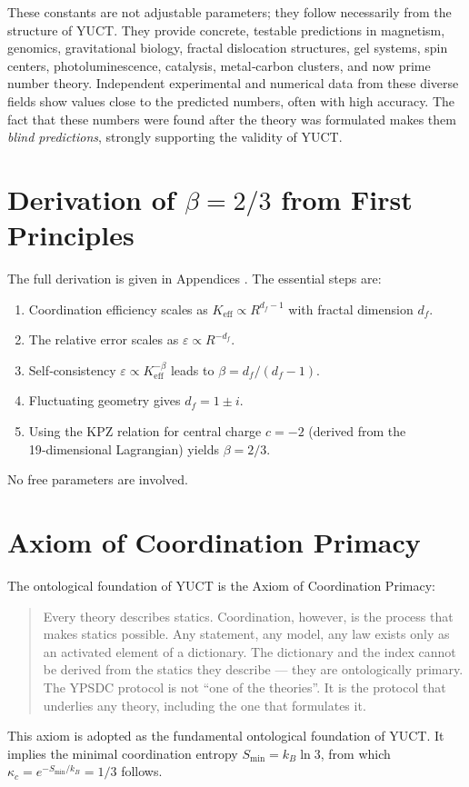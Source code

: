 \documentclass[12pt,a4paper]{article}
\begin{document}
	These constants are not adjustable parameters; they follow necessarily from the structure of YUCT. They provide concrete, testable predictions in magnetism, genomics, gravitational biology, fractal dislocation structures, gel systems, spin centers, photoluminescence, catalysis, metal‑carbon clusters, and now prime number theory. Independent experimental and numerical data from these diverse fields show values close to the predicted numbers, often with high accuracy. The fact that these numbers were found after the theory was formulated makes them \emph{blind predictions}, strongly supporting the validity of YUCT.
	
	\appendix
	\section{Derivation of \(\beta = 2/3\) from First Principles}
	\label{app:beta_derivation}
	The full derivation is given in Appendices \cite{AppendixL, AppendixY}. The essential steps are:
	\begin{enumerate}
		\item Coordination efficiency scales as \(K_{\mathrm{eff}} \propto R^{d_f-1}\) with fractal dimension \(d_f\).
		\item The relative error scales as \(\varepsilon \propto R^{-d_f}\).
		\item Self‑consistency \(\varepsilon \propto K_{\mathrm{eff}}^{-\beta}\) leads to \(\beta = d_f/(d_f-1)\).
		\item Fluctuating geometry gives \(d_f = 1 \pm i\).
		\item Using the KPZ relation for central charge \(c = -2\) (derived from the 19‑dimensional Lagrangian) yields \(\beta = 2/3\).
	\end{enumerate}
	No free parameters are involved.
	
	\section{Axiom of Coordination Primacy}
	\label{app:axiom}
	The ontological foundation of YUCT is the Axiom of Coordination Primacy:
	\begin{quote}
		Every theory describes statics. Coordination, however, is the process that makes statics possible. Any statement, any model, any law exists only as an activated element of a dictionary. The dictionary and the index cannot be derived from the statics they describe — they are ontologically primary. The YPSDC protocol is not “one of the theories”. It is the protocol that underlies any theory, including the one that formulates it.
	\end{quote}
	This axiom is adopted as the fundamental ontological foundation of YUCT. It implies the minimal coordination entropy \(S_{\min} = k_B \ln 3\), from which \(\kappa_c = e^{-S_{\min}/k_B} = 1/3\) follows.
	
\end{document}
